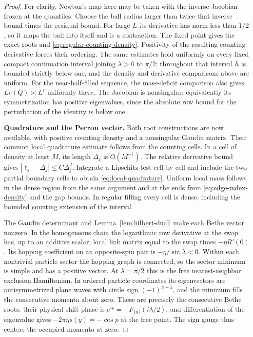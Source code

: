 \begin{proof}
For clarity, Newton's map here may be taken with the inverse
Jacobian frozen at the quantiles.  Choose the ball radius larger
than twice that inverse bound times the residual bound.
For large $L$ its derivative has norm less than $1/2$, so it maps
the ball into itself and is a contraction.  The fixed point gives
the exact roots and \eqref{eq:regular-counting-density}.
Positivity of the resulting counting derivative forces their
ordering.  The same estimates hold uniformly on every fixed compact
continuation interval joining $\lambda>0$ to $\pi/2$: throughout
that interval $h$ is bounded strictly below one, and the density
and derivative comparisons above are uniform.  For the
near-half-filled sequence, the mass-deficit comparison also gives
$Lr(Q)\asymp L^\epsilon$ uniformly there.  The Jacobian is
nonsingular; equivalently its symmetrization has positive
eigenvalues, since the absolute row bound for the perturbation of
the identity is below one.

\smallskip\noindent\textbf{Quadrature and the Perron vector.}
Both root constructions are now available, with positive counting
density and a nonsingular Gaudin matrix. Their common local
quadrature estimate follows from the counting cells.
In a cell of density at least $M$, its length $\Delta_j$
is $O(M^{-1})$.  The relative derivative bound gives
$|\ell_j-\Delta_j|\le C\Delta_j^2$.  Integrate a Lipschitz test
cell by cell and include the two partial boundary cells to obtain
\eqref{eq:local-quadrature}.  Uniform local mass follows in the
dense region from the same argument and at the ends from
\eqref{eq:edge-index-density} and the gap bounds.  In regular
filling every cell is dense, including the bounded counting
extension of the interval.

The Gaudin determinant and Lemma~\ref{lem:hilbert-dual} make
each Bethe vector nonzero.  In the homogeneous chain the logarithmic
row derivative at the swap has, up to an additive scalar, local
link matrix equal to the swap times $-\eta R'(0)$.  Its hopping
coefficient on an opposite-spin pair is $-\eta/\sin\lambda<0$.
Within each nontrivial particle sector the hopping graph is
connected, so the sector minimum is simple and has a positive
vector.  At $\lambda=\pi/2$ this is the free nearest-neighbor
exclusion Hamiltonian.  In ordered particle coordinates its
eigenvectors are antisymmetrized plane waves with circle sign
$(-1)^{n-1}$, and the minimum fills the consecutive momenta about
zero.  These are precisely the consecutive Bethe roots: their
physical shift phase is
$e^{ip}=-F_{\{y\}}(i\lambda/2)$, and differentiation of the
eigenvalue gives $-2\pi\eta s(y)=-\cos p$ at the free point.
The sign gauge thus centers the occupied momenta at zero.


\end{proof}
